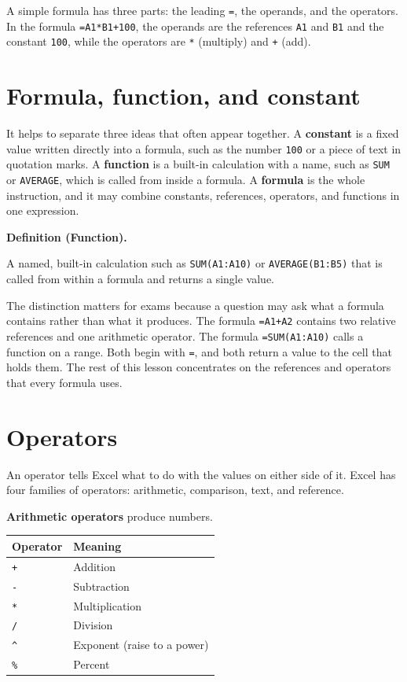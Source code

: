 \documentclass[11pt]{article}
\newenvironment{definitionbox}[1]{%
  \par\noindent\textbf{Definition (#1).}\ \itshape
}{\par\vspace{0.3em}}
\begin{document}
A simple formula has three parts: the leading \texttt{=}, the operands, and
the operators. In the formula \texttt{=A1*B1+100}, the operands are the
references \texttt{A1} and \texttt{B1} and the constant \texttt{100}, while
the operators are \texttt{*} (multiply) and \texttt{+} (add).

\section{Formula, function, and constant}
It helps to separate three ideas that often appear together. A
\textbf{constant} is a fixed value written directly into a formula, such as
the number \texttt{100} or a piece of text in quotation marks. A
\textbf{function} is a built-in calculation with a name, such as
\texttt{SUM} or \texttt{AVERAGE}, which is called from inside a formula. A
\textbf{formula} is the whole instruction, and it may combine constants,
references, operators, and functions in one expression.

\begin{definitionbox}{Function}
A named, built-in calculation such as \texttt{SUM(A1:A10)} or
\texttt{AVERAGE(B1:B5)} that is called from within a formula and returns a
single value.
\end{definitionbox}

The distinction matters for exams because a question may ask what a formula
contains rather than what it produces. The formula \texttt{=A1+A2} contains
two relative references and one arithmetic operator. The formula
\texttt{=SUM(A1:A10)} calls a function on a range. Both begin with \texttt{=},
and both return a value to the cell that holds them. The rest of this lesson
concentrates on the references and operators that every formula uses.

\section{Operators}
An operator tells Excel what to do with the values on either side of it.
Excel has four families of operators: arithmetic, comparison, text, and
reference.

\textbf{Arithmetic operators} produce numbers.

\begin{center}
\begin{tabular}{p{}p{}}
\toprule
\textbf{Operator} & \textbf{Meaning} \\
\midrule
\texttt{+} & Addition \\
\texttt{-} & Subtraction \\
\texttt{*} & Multiplication \\
\texttt{/} & Division \\
\texttt{\textasciicircum} & Exponent (raise to a power) \\
\texttt{\%} & Percent \\
\bottomrule
\end{tabular}
\end{center}
\end{document}
